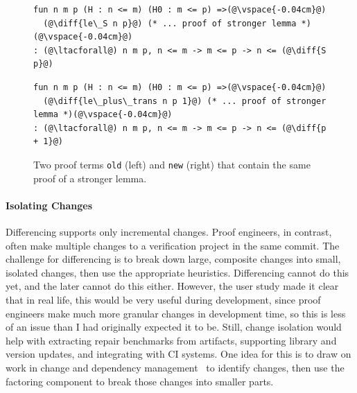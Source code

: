 \begin{figure}[ht]
\begin{minipage}{0.48\textwidth}
\begin{lstlisting}[language=coq]
fun n m p (H : n <= m) (H0 : m <= p) =>(@\vspace{-0.04cm}@)
  (@\diff{le\_S n p}@) (* ... proof of stronger lemma *)(@\vspace{-0.04cm}@)
: (@\ltacforall@) n m p, n <= m -> m <= p -> n <= (@\diff{S p}@)
\end{lstlisting}
\end{minipage}
\hfill
\begin{minipage}{0.48\textwidth}
\begin{lstlisting}[language=coq]
fun n m p (H : n <= m) (H0 : m <= p) =>(@\vspace{-0.04cm}@)
  (@\diff{le\_plus\_trans n p 1}@) (* ... proof of stronger lemma *)(@\vspace{-0.04cm}@)
: (@\ltacforall@) n m p, n <= m -> m <= p -> n <= (@\diff{p + 1}@)
\end{lstlisting}
\end{minipage}
\vspace{-.35cm}
\caption{Two proof terms \lstinline{old} (left) and \lstinline{new} (right) that contain the same proof of a stronger lemma.}
\label{fig:stronger}
\end{figure}

\paragraph{Isolating Changes} Differencing supports only incremental changes.
Proof engineers, in contrast, often make multiple changes to a verification project in the same commit. %
The challenge for differencing is to break down large, composite changes into small, isolated changes,
then use the appropriate heuristics.
Differencing cannot do this yet, and the later \toolnamec cannot do this either.
However, the user study made it clear that in real life, this would be very useful during development,
since proof engineers make much more granular changes in development time, %
so this is less of an issue than I had originally expected it to be.
Still, change isolation would help with extracting repair benchmarks from artifacts, supporting library and version updates, and integrating with CI systems.
One idea for this is to draw on work in change and dependency management~\cite{873647, Autexier:2010:CMH:1986659.1986663, Celik:2017:IRP:3155562.3155588} to identify changes,
then use the factoring component to break those changes into smaller parts.


